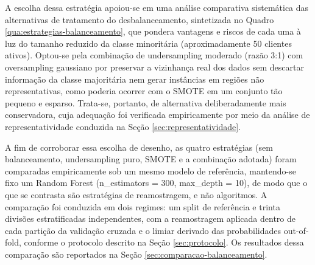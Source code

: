 A escolha dessa estratégia apoiou-se em uma análise comparativa sistemática das alternativas de tratamento do desbalanceamento, sintetizada no Quadro \ref{qua:estrategias-balanceamento}, que pondera vantagens e riscos de cada uma à luz do tamanho reduzido da classe minoritária (aproximadamente 50 clientes ativos). Optou-se pela combinação de undersampling moderado (razão 3:1) com oversampling gaussiano por preservar a vizinhança real dos dados sem descartar informação da classe majoritária nem gerar instâncias em regiões não representativas, como poderia ocorrer com o SMOTE \cite{chawla2002} em um conjunto tão pequeno e esparso. Trata-se, portanto, de alternativa deliberadamente mais conservadora, cuja adequação foi verificada empiricamente por meio da análise de representatividade conduzida na Seção \ref{sec:representatividade}.

A fim de corroborar essa escolha de desenho, as quatro estratégias (sem balanceamento, undersampling puro, SMOTE e a combinação adotada) foram comparadas empiricamente sob um mesmo modelo de referência, mantendo-se fixo um Random Forest (n\_estimators = 300, max\_depth = 10), de modo que o que se contrasta são estratégias de reamostragem, e não algoritmos. A comparação foi conduzida em dois regimes: um split de referência e trinta divisões estratificadas independentes, com a reamostragem aplicada dentro de cada partição da validação cruzada e o limiar derivado das probabilidades out-of-fold, conforme o protocolo descrito na Seção \ref{sec:protocolo}. Os resultados dessa comparação são reportados na Seção \ref{sec:comparacao-balanceamento}.

